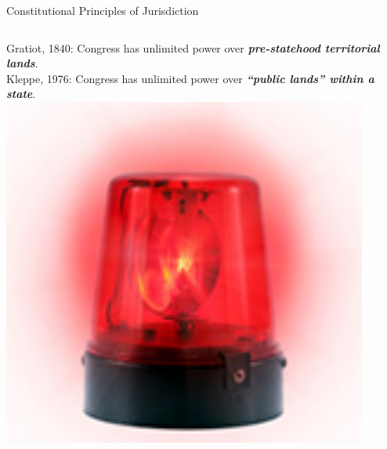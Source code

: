 \begin{frame}{Constitutional Principles of Jurisdiction}
    \begin{columns}[onlytextwidth]
            { \large
            Gratiot, 1840: Congress has unlimited power over \textbf{\emph{pre-statehood territorial lands}}. \\
            \vspace{20pt}
            Kleppe, 1976: Congress has unlimited power over \textbf{\emph{``public lands'' within a state}}. \\
            }
            \centering
            \includegraphics[width=0.9\textwidth]{img/red-light.png} \\
    \end{columns}
\end{frame}


